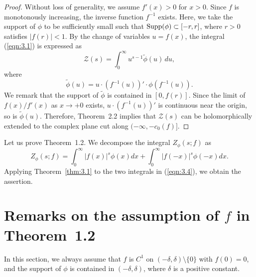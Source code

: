 \documentclass[12pt]{amsart}
\numberwithin{equation}{section}
\theoremstyle{definition}
\theoremstyle{remark}
\newcommand{\1}{{\bf 1}}
\begin{document}
\begin{proof}
Without loss of generality, we assume 
$f'(x)>0$ for $x>0$.
Since $f$ is monotonously increasing, 
the inverse function $f^{-1}$ exists.
Here, 
we take the support of $\phi$ to be sufficiently small such that ${\rm Supp}(\phi)\subset [-r,r]$, 
where $r>0$ satisfies $|f(r)|<1$.
By the change of variables $u=f(x)$,
the integral (\ref{eqn:3.1}) is expressed as
\begin{equation}\label{eqn:3.2}
\mathcal{Z}(s)=\int_0^{\infty} u^{s-1}\tilde{\phi}(u)\,du,
\end{equation}
where 
\begin{equation}
\tilde{\phi}(u)=u\cdot(f^{-1}(u))' 
\cdot \phi(f^{-1}(u)).
\end{equation}\label{eqn:3.3}
We remark that 
the support of $\tilde{\phi}$ is 
contained in $[0, f(r)]$. 
Since the limit of $f(x)/f'(x)$ as $x\to +0$ exists,
$u\cdot(f^{-1}(u))'$ is continuous near the origin,
so is $\tilde{\phi}(u)$. 
Therefore, Theorem~2.2 implies that 
$\mathcal{Z}(s)$ can be holomorphically extended to
the complex plane cut along $(-\infty,-c_0(f)]$.
\end{proof}

Let us prove Theorem~1.2.
We decompose the integral $Z_{\phi}(s;f)$ as
\begin{equation}\label{eqn:3.4}
Z_{\phi}(s;f)=
\int_{0}^{\infty}|f(x)|^s \phi(x)dx+
\int_{0}^{\infty}|f(-x)|^s \phi(-x)dx.
\end{equation}
Applying Theorem~\ref{thm:3.1} 
to the two integrals in (\ref{eqn:3.4}),
we obtain the assertion.


\section{Remarks on the assumption
of $f$ in Theorem~1.2}

In this section, 
we always assume that
$f$ is $C^{1}$ 
on $(-\delta, \delta)\setminus\{0\}$ 
with $f(0)=0$, and the support of 
$\phi$ is contained in $(-\delta, \delta)$, 
where $\delta$ is a positive constant. 
\end{document}
